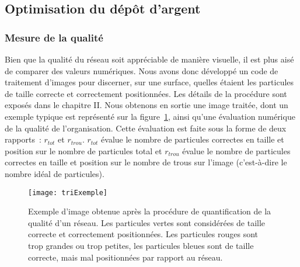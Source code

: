 	\subsection{Optimisation du dépôt d'argent}
	\label{sQuality}
	\subsubsection{Mesure de la qualité}
Bien que la qualité du réseau soit appréciable de manière visuelle, il est plus aisé de comparer des valeurs numériques. Nous avons donc développé un code de traitement d'images pour discerner, sur une surface, quelles étaient les particules de taille correcte et correctement positionnées. Les détails de la procédure sont exposés dans le chapitre II. Nous obtenons en sortie une image traitée, dont un exemple typique est représenté sur la figure~\ref{triExempleChpter3}, ainsi qu'une évaluation numérique de la qualité de l'organisation. Cette évaluation est faite sous la forme de deux rapports~: $r_{tot}$ et $r_{trou}$. $r_{tot}$ évalue le nombre de particules correctes en taille et position sur le nombre de particules total et $r_{trou}$ évalue le nombre de particules correctes en taille et position sur le nombre de trous sur l'image (c'est-à-dire le nombre idéal de particules). \par 
\begin{figure}[!htb]
\centering
\texttt{[image: triExemple]}
\caption{Exemple d'image obtenue après la procédure de quantification de la qualité d'un réseau. Les particules vertes sont considérées de taille correcte et correctement positionnées. Les particules rouges sont trop grandes ou trop petites, les particules bleues sont de taille correcte, mais mal positionnées par rapport au réseau.}
\label{triExempleChpter3}
\end{figure}
